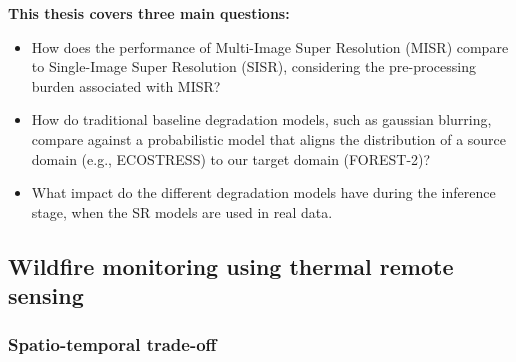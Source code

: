     \textbf{This thesis covers three main questions:}

    \begin{itemize}
        \item How does the performance of Multi-Image Super Resolution (MISR) compare to Single-Image Super Resolution (SISR), considering the pre-processing burden associated with MISR?

        \item How do traditional baseline degradation models, such as gaussian blurring, compare against a probabilistic model that aligns the distribution of a source domain (e.g., ECOSTRESS) to our  target domain (FOREST-2)?

        \item What impact do the different degradation models have during the inference stage, when the SR models are used in real data.
    \end{itemize}
         
          
        



    

    \newpage

    \subsection{Wildfire monitoring using thermal remote sensing}

    

    \subsubsection{Spatio-temporal trade-off}
